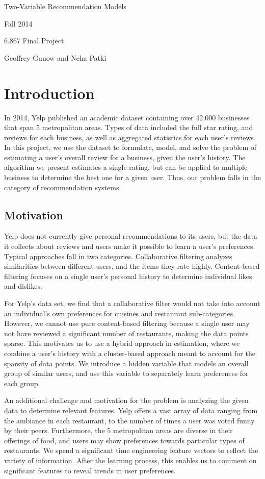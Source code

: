 \documentclass[11pt]{article}
\author{6.867 Homework 2 and 3}
\begin{document}
\noindent\centerline{\LARGE{Two-Variable Recommendation Models}}
\noindent\centerline{}
\noindent\centerline{}
\noindent\centerline{Fall 2014}
\noindent\centerline{6.867 Final Project}
\noindent\centerline{Geoffrey Gunow and Neha Patki}

\section{Introduction}
In 2014, Yelp published an academic dataset containing over 42,000 businesses that span 5 metropolitan areas. Types of data included the full star rating, and reviews for each business, as well as aggregated statistics for each user's reviews. In this project, we use the dataset to formulate, model, and solve the problem of estimating a user's overall review for a business, given the user's history. The algorithm we present estimates a single rating, but can be applied to multiple business to determine the best one for a given user. Thus, our problem falls in the category of recommendation systems.

\subsection{Motivation}
Yelp does not currently give personal recommendations to its users, but the data it collects about reviews and users make it possible to learn a user's preferences. Typical approaches fall in two categories. Collaborative filtering analyzes similarities between different users, and the items they rate highly. Content-based filtering focuses on a single user's personal history to determine individual likes and dislikes.

For Yelp's data set, we find that a collaborative filter would not take into account an individual's own preferences for cuisines and restaurant sub-categories. However, we cannot use pure content-based filtering because a single user may not have reviewed a significant number of restaurants, making the data points sparse. This motivates us to use a hybrid approach in estimation, where we combine a user's history with a cluster-based approach meant to account for the sparsity of data points. We introduce a hidden variable that models an overall group of similar users, and use this variable to separately learn preferences for each group.

An additional challenge and motivation for the problem is analyzing the given data to determine relevant features. Yelp offers a vast array of data ranging from the ambiance in each restaurant, to the number of times a user was voted funny by their peers. Furthermore, the 5 metropolitan areas are diverse in their offerings of food, and users may show preferences towards particular types of restaurants. We spend a significant time engineering feature vectors to reflect the variety of information. After the learning process, this enables us to comment on significant features to reveal trends in user preferences. 
\end{document}
